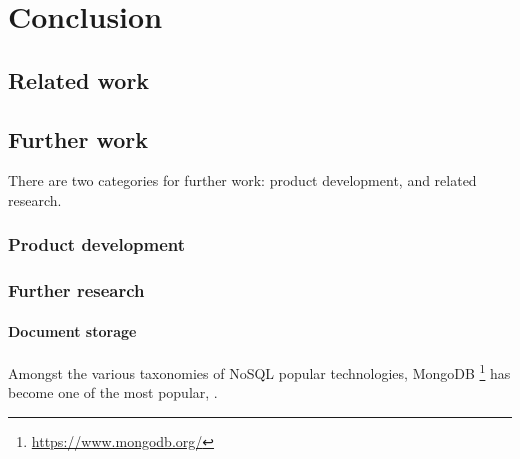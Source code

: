 \chapter{Conclusion}\label{chap:conclusion}





\cite{cummins2014pip-db}
\cite{cummins2014migrating}

\lipsum[30-37]

\section{Related work}

\lipsum[30-37]

\section{Further work}

There are two categories for further work: product development, and
related research.

\subsection{Product development}


\subsection{Further research}

\subsubsection*{Document storage}\label{subsec:document-storage}

Amongst the various taxonomies of NoSQL popular technologies,
MongoDB \footnote{\url{https://www.mongodb.org/}} has become one of
the most popular, \cite{tudorica2011comparison, mongo2014leading,
  hecht2011nosql, mongo2013top5}.






\cite{chodorow2013mongodb}
